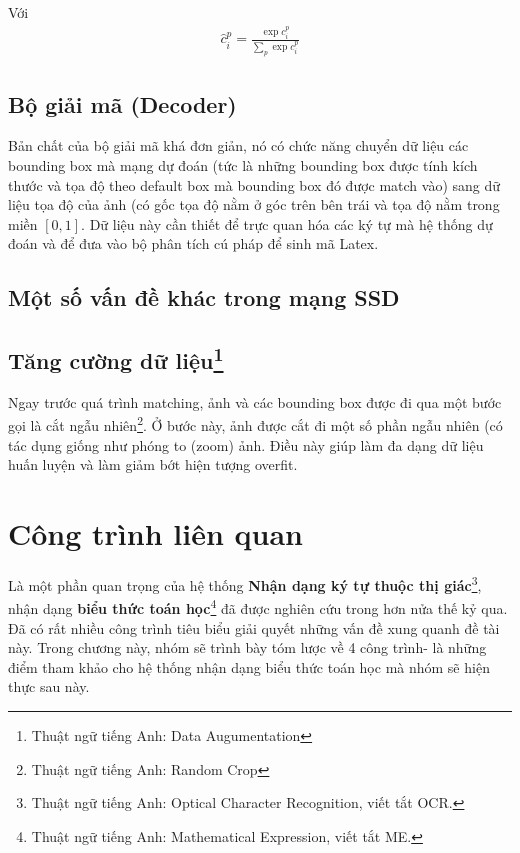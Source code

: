 \documentclass[a4paper]{article}
\theoremstyle{definition}
\begin{document}
	Với \begin{align}\hat{c}_i^p = \frac{\exp{c_i^p}}{\sum_p \exp{c}_i^p}\end{align}
	
	\subsection{Bộ giải mã (Decoder)}
	
	Bản chất của bộ giải mã khá đơn giản, nó có chức năng chuyển dữ liệu các bounding box mà mạng dự đoán (tức là những bounding box được tính kích thước và tọa độ theo default box mà bounding box đó được match vào) sang dữ liệu tọa độ của ảnh (có gốc tọa độ nằm ở góc trên bên trái và tọa độ nằm trong miền $[0, 1]$. Dữ liệu này cần thiết để trực quan hóa các ký tự mà hệ thống dự đoán và để đưa vào bộ phân tích cú pháp để sinh mã Latex.
	
	\subsection{Một số vấn đề khác trong mạng SSD\cite{liu2016ssd}}
	\subsection*{Tăng cường dữ liệu\footnote{Thuật ngữ tiếng Anh: Data Augumentation}}
	
	Ngay trước quá trình matching, ảnh và các bounding box được đi qua một bước gọi là cắt ngẫu nhiên\footnote{Thuật ngữ tiếng Anh: Random Crop}. Ở bước này, ảnh được cắt đi một số phần ngẫu nhiên (có tác dụng giống như phóng to (zoom) ảnh. Điều này giúp làm đa dạng dữ liệu huấn luyện và làm giảm bớt hiện tượng overfit.
	
	
	
	
	
	\newpage
	\section{Công trình liên quan}
	Là một phần quan trọng của hệ thống \textbf{Nhận dạng ký tự thuộc thị giác}\footnote{Thuật ngữ tiếng Anh: Optical Character Recognition, viết tắt OCR.}, nhận dạng \textbf{biểu thức toán học}\footnote{Thuật ngữ tiếng Anh: Mathematical Expression, viết tắt ME.} đã được nghiên cứu trong hơn nửa thế kỷ qua. Đã có rất nhiều công trình tiêu biểu giải quyết những vấn đề xung quanh đề tài này. Trong chương này, nhóm sẽ trình bày tóm lược về 4 công trình- là những điểm tham khảo cho hệ thống nhận dạng biểu thức toán học mà nhóm sẽ hiện thực sau này.\\
\end{document}
